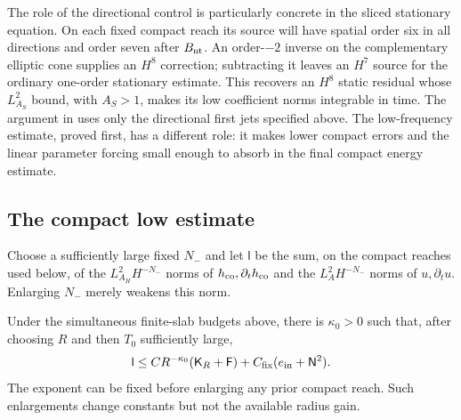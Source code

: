 The role of the directional control is particularly concrete in the sliced
stationary equation.  On each fixed compact reach its source will have
spatial order six in all directions and order seven after $B_{\rm nt}$.
An order-$-2$ inverse on the complementary
elliptic cone supplies an $H^8$ correction; subtracting it leaves an $H^7$
source for the ordinary one-order stationary estimate.  This recovers an
$H^8$ static residual whose $L^2_{A_S}$ bound, with $A_S>1$, makes its
low coefficient norms integrable in time.  The argument in
 uses only the directional first jets specified above.
The low-frequency estimate, proved first, has a different role: it makes
lower compact errors and the linear parameter forcing small enough to absorb
in the final compact energy estimate.

\subsection{The compact low estimate}

Choose a sufficiently large fixed $N_-$ and let $\mathsf l$ be the sum, on
the compact reaches used below, of the $L^2_{A_H}H^{-N_-}$ norms of
$h_{\rm co},\partial_t h_{\rm co}$ and the $L^2_AH^{-N_-}$ norms of
$u,\partial_tu$.  Enlarging $N_-$ merely weakens this norm.

\begin{proposition}\label{co2:low-transfer}
Under the simultaneous finite-slab budgets above, there is $\kappa_0>0$ such
that, after choosing $R$ and then $T_0$ sufficiently large,
\begin{equation}\label{co2:low-bound}
 \mathsf l\le C R^{-\kappa_0}(\mathsf K_R+\mathsf F)
       +C_{\rm fix}(e_{\rm in}+\mathsf N^2).
\end{equation}
The exponent can be fixed before enlarging any prior compact reach.  Such
enlargements change constants but not the available radius gain.
\end{proposition}


